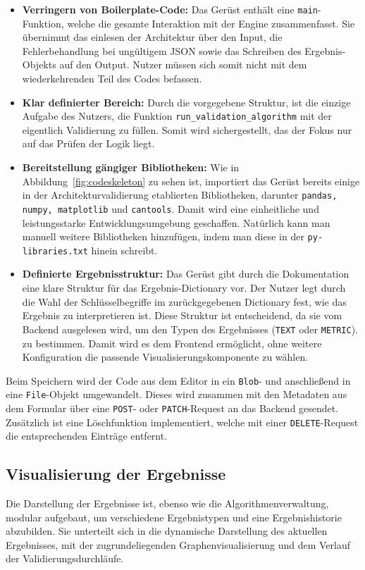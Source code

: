 \begin{itemize}
  \item \textbf{Verringern von Boilerplate-Code:} Das Gerüst enthält eine \texttt{main}-Funktion, welche die gesamte Interaktion mit der Engine zusammenfasst. Sie übernimmt das einlesen der Architektur über den Input, die Fehlerbehandlung bei ungültigem JSON sowie das Schreiben des Ergebnis-Objekts auf den Output. Nutzer müssen sich somit nicht mit dem wiederkehrenden Teil des Codes befassen.
  \item \textbf{Klar definierter Bereich:} Durch die vorgegebene Struktur, ist die einzige Aufgabe des Nutzers, die Funktion \texttt{run\_validation\_algorithm} mit der eigentlich Validierung zu füllen. Somit wird sichergestellt, das der Fokus nur auf das Prüfen der Logik liegt.
  \item \textbf{Bereitstellung gängiger Bibliotheken:} Wie in Abbildung~\ref{fig:codeskeleton} zu sehen ist, importiert das Gerüst bereits einige in der Architekturvalidierung etablierten Bibliotheken, darunter \texttt{pandas, numpy, matplotlib} und \texttt{cantools}. Damit wird eine einheitliche und leistungsstarke Entwicklungsumgebung geschaffen. Natürlich kann man manuell weitere Bibliotheken hinzufügen, indem man diese in der \texttt{py-libraries.txt} hinein schreibt.
  \item \textbf{Definierte Ergebnisstruktur:} Das Gerüst gibt durch die Dokumentation eine klare Struktur für das Ergebnis-Dictionary vor. Der Nutzer legt durch die Wahl der Schlüsselbegriffe im zurückgegebenen Dictionary fest, wie das Ergebnis zu interpretieren ist. Diese Struktur ist entscheidend, da sie vom Backend ausgelesen wird, um den Typen des Ergebnisses (\texttt{TEXT} oder \texttt{METRIC}). zu bestimmen. Damit wird es dem Frontend ermöglicht, ohne weitere Konfiguration die passende Visualisierungskomponente zu wählen.
\end{itemize}

Beim Speichern wird der Code aus dem Editor in ein \texttt{Blob}- und anschließend in eine \texttt{File}-Objekt umgewandelt. Dieses wird zusammen mit den Metadaten aus dem Formular über eine \texttt{POST}- oder \texttt{PATCH}-Request an das Backend gesendet. Zusätzlich ist eine Löschfunktion implementiert, welche mit einer \texttt{DELETE}-Request die entsprechenden Einträge entfernt.

\subsection{Visualisierung der Ergebnisse}
\label{subsec:visual}
Die Darstellung der Ergebnisse ist, ebenso wie die Algorithmenverwaltung, modular aufgebaut, um verschiedene Ergebnistypen und eine Ergebnishistorie abzubilden. Sie unterteilt sich in die dynamische Darstellung des aktuellen Ergebnisses, mit der zugrundeliegenden Graphenvisualisierung und dem Verlauf der Validierungsdurchläufe.

